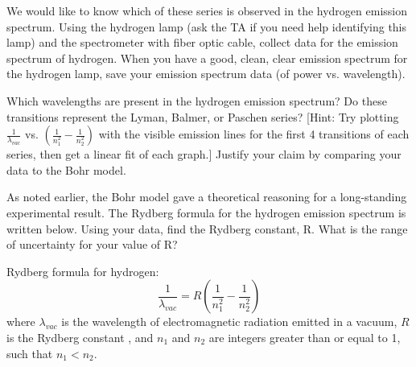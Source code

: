 \par
We would like to know which of these series is observed in the hydrogen emission spectrum.
Using the hydrogen lamp (ask the TA if you need help identifying this lamp) and the spectrometer with fiber optic cable, collect data for the emission spectrum of hydrogen. 
When you have a good, clean, clear emission spectrum for the hydrogen lamp, save your emission spectrum data (of power vs. wavelength).
\par 
Which wavelengths are present in the hydrogen emission spectrum? 
Do these transitions represent the Lyman, Balmer, or Paschen series? [Hint: Try plotting $\frac{1}{\lambda_{vac}}$ vs. $(\frac{1}{n_{1}^{2}} - \frac{1}{n_{2}^{2}})$ with the visible emission lines for the first 4 transitions of each series, then get a linear fit of each graph.]
Justify your claim by comparing your data to the Bohr model. 
\par 
As noted earlier, the Bohr model gave a theoretical reasoning for a long-standing experimental result. 
The Rydberg formula for the hydrogen emission spectrum is written below. 
Using your data, find the Rydberg constant, R. 
What is the range of uncertainty for your value of R?
\par
\noindent
Rydberg formula for hydrogen:
\[ \frac{1}{\lambda_{vac}} = R \left( \frac{1}{n_{1}^{2}} - \frac{1}{n_{2}^{2}} \right) \]
where $ \lambda_{vac} $ is the wavelength of electromagnetic radiation emitted in a vacuum, $R$ is the Rydberg constant %
, and $n_{1}$ and $n_{2}$ are integers greater than or equal to 1, such that $n_{1} < n_{2}$.

